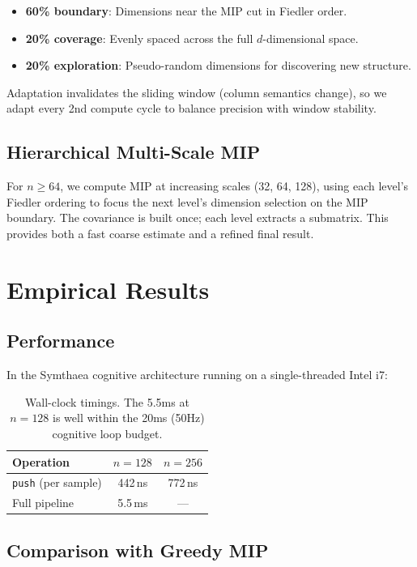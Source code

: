 \documentclass[10pt,letterpaper]{article}
\begin{document}
\begin{itemize}[nosep]
  \item \textbf{60\% boundary}: Dimensions near the MIP cut in Fiedler order.
  \item \textbf{20\% coverage}: Evenly spaced across the full $d$-dimensional space.
  \item \textbf{20\% exploration}: Pseudo-random dimensions for discovering new structure.
\end{itemize}

Adaptation invalidates the sliding window (column semantics change), so we adapt every 2nd compute cycle to balance precision with window stability.

\subsection{Hierarchical Multi-Scale MIP}

For $n \geq 64$, we compute MIP at increasing scales (32, 64, 128), using each level's Fiedler ordering to focus the next level's dimension selection on the MIP boundary. The covariance is built once; each level extracts a submatrix. This provides both a fast coarse estimate and a refined final result.

\section{Empirical Results}

\subsection{Performance}

In the Symthaea cognitive architecture running on a single-threaded Intel i7:

\begin{table}[h]
\centering
\begin{tabular}{lcc}
\toprule
\textbf{Operation} & $n = 128$ & $n = 256$ \\
\midrule
\texttt{push} (per sample) & 442\,ns & 772\,ns \\
Full pipeline & 5.5\,ms & --- \\
\bottomrule
\end{tabular}
\caption{Wall-clock timings. The 5.5ms at $n=128$ is well within the 20ms (50Hz) cognitive loop budget.}
\end{table}

\subsection{Comparison with Greedy MIP}
\end{document}
